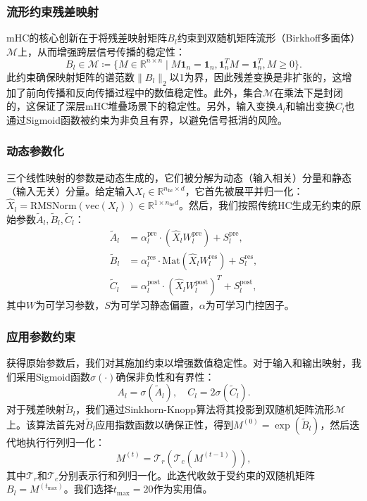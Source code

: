 \documentclass[11pt,a4paper]{article}
\begin{document}
\subsubsection*{流形约束残差映射}
mHC的核心创新在于将残差映射矩阵\(B_{l}\)约束到双随机矩阵流形（Birkhoff多面体）\(\mathcal{M}\)上，从而增强跨层信号传播的稳定性：
\[B_{l}\in \mathcal{M}\coloneqq \{M\in \mathbb{R}^{n\times n}\mid M\mathbf{1}_{n} = \mathbf{1}_{n},\mathbf{1}_{n}^{T}M = \mathbf{1}_{n}^{T},M\geqslant 0\} .\]
此约束确保映射矩阵的谱范数\(\| B_{l}\|_{2}\)以1为界，因此残差变换是非扩张的，这增加了前向传播和反向传播过程中的数值稳定性。此外，集合\(\mathcal{M}\)在乘法下是封闭的，这保证了深层mHC堆叠场景下的稳定性。另外，输入变换\(A_{l}\)和输出变换\(C_{l}\)也通过Sigmoid函数被约束为非负且有界，以避免信号抵消的风险。

\subsubsection*{动态参数化}
三个线性映射的参数是动态生成的，它们被分解为动态（输入相关）分量和静态（输入无关）分量。给定输入\(X_{l}\in \mathbb{R}^{n_{\mathrm{hc}}\times d}\)，它首先被展平并归一化：\(\hat{X}_{l} = \mathrm{RMSNorm}(\mathrm{vec}(X_{l}))\in \mathbb{R}^{1\times n_{\mathrm{hc}}d}\)。然后，我们按照传统HC生成无约束的原始参数\(\tilde{A}_{l},\tilde{B}_{l},\tilde{C}_{l}\)：
\[\begin{array}{rl} 
\tilde{A}_{l} &= \alpha_{l}^{\mathrm{pre}}\cdot (\hat{X}_{l}W_{l}^{\mathrm{pre}}) + S_{l}^{\mathrm{pre}},\\
\tilde{B}_{l} &= \alpha_{l}^{\mathrm{res}}\cdot \mathrm{Mat}(\hat{X}_{l}W_{l}^{\mathrm{res}}) + S_{l}^{\mathrm{res}},\\
\tilde{C}_{l} &= \alpha_{l}^{\mathrm{post}}\cdot (\hat{X}_{l}W_{l}^{\mathrm{post}})^{T} + S_{l}^{\mathrm{post}},
\end{array}\]
其中\(W\)为可学习参数，\(S\)为可学习静态偏置，\(\alpha\)为可学习门控因子。

\subsubsection*{应用参数约束}
获得原始参数后，我们对其施加约束以增强数值稳定性。对于输入和输出映射，我们采用Sigmoid函数\(\sigma(\cdot)\)确保非负性和有界性：
\[A_{l} = \sigma(\tilde{A}_{l}),\quad C_{l} = 2\sigma(\tilde{C}_{l}).\]
对于残差映射\(\tilde{B}_{l}\)，我们通过Sinkhorn-Knopp算法将其投影到双随机矩阵流形\(\mathcal{M}\)上。该算法首先对\(\tilde{B}_{l}\)应用指数函数以确保正性，得到\(M^{(0)} = \exp(\tilde{B}_{l})\)，然后迭代地执行行列归一化：
\[M^{(t)} = \mathcal{T}_{r}(\mathcal{T}_{c}(M^{(t-1)})),\]
其中\(\mathcal{T}_{r}\)和\(\mathcal{T}_{c}\)分别表示行和列归一化。此迭代收敛于受约束的双随机矩阵\(B_{l} = M^{(t_{\mathrm{max}})}\)。我们选择\(t_{\mathrm{max}} = 20\)作为实用值。
\end{document}
